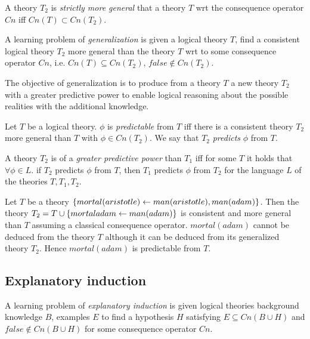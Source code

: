 \begin{defn}
A theory $T_2$ is \emph{strictly more general} that a theory $T$ wrt the consequence operator $Cn$ iff $Cn(T) \subset Cn(T_2)$.
\end{defn}

\begin{defn}
A learning problem of \emph{generalization} is given a logical theory $T$, find a consistent logical theory $T_2$ more general than the theory $T$ wrt to some consequence operator $Cn$, i.e.
$Cn(T) \subseteq Cn(T_2)$, $false \not\in Cn(T_2)$.
\end{defn}

The objective of generalization is to produce from a theory $T$ a new theory $T_2$ with a greater predictive power to enable logical reasoning about the possible realities with the additional knowledge.

\begin{defn}
Let $T$ be a logical theory. $\phi$ is \emph{predictable} from $T$ iff there is a consistent theory $T_2$ more general than $T$ with $\phi \in Cn(T_2)$. We say that $T_2$ \emph{predicts} $\phi$ from $T$.
\end{defn}

\begin{defn}
A theory $T_2$ is of a \emph{greater predictive power} than $T_1$ iff
for some $T$ it holds that $\forall \phi \in L.$ if $T_2$ predicts $\phi$ from $T$, then $T_1$ predicts $\phi$ from $T_2$ for the language $L$ of the theories $T, T_1, T_2$.
\end{defn}

\begin{exmp}
Let $T$ be a theory $\{mortal(aristotle) \leftarrow man(aristotle), man(adam)\}$. Then the theory $T_2=T \cup \{mortal{adam} \leftarrow man(adam)\}$ is consistent and more general than $T$ assuming a classical consequence operator. $mortal(adam)$ cannot be deduced from the theory $T$ although it can be deduced from its generalized theory $T_2$. Hence $mortal(adam)$ is predictable from $T$.
\end{exmp}

\subsection{Explanatory induction\cite{yamamoto2012inverse}}
\begin{defn}\cite{flach1996rationality} A learning problem of \emph{explanatory induction} is given logical theories background knowledge $B$, examples $E$ to find a hypothesis $H$ satisfying $E \subseteq Cn(B \cup H)$ and $false \not\in Cn(B \cup H)$ for some consequence operator $Cn$.
\end{defn}

